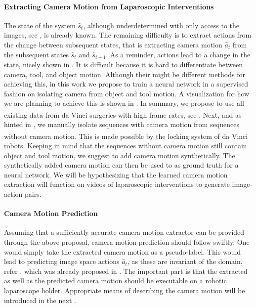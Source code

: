 \paragraph{Extracting Camera Motion from Laparoscopic Interventions}
The state of the system $\hat{s}_t$, although underdetermined with only access to the images, see , is already known. The remaining difficulty is to extract actions from the change between subsequent states, that is extracting camera motion $\hat{a}_t$ from the subsequent states $\hat{s}_t$ and $\hat{s}_{t+1}$. As a reminder, actions lead to a change in the state, nicely shown in . It is difficult because it is hard to differentiate between camera, tool, and object motion. Although their might be different methods for achieving this, in this work we propose to train a neural network in a supervised fashion on isolating camera from object and tool motion. A visualization for how we are planning to achieve this is shown in . In summary, we propose to use all existing data from da Vinci\textsuperscript{\textregistered} surgeries with high frame rates, see . Next, and as hinted in , we manually isolate sequences with camera motion from sequences without camera motion. This is made possible by the locking system of da Vinci\textsuperscript{\textregistered} robots. Keeping in mind that the sequences without camera motion still contain object and tool motion, we suggest to add camera motion synthetically. The synthetically added camera motion can then be used to as ground truth for a neural network. We will be hypothesizing that the learned camera motion extraction will function on videos of laparoscopic interventions to generate image-action pairs.

\paragraph{Camera Motion Prediction} Assuming that a sufficiently accurate camera motion extractor can be provided through the above proposal, camera motion prediction should follow swiftly. One would simply take the extracted camera motion as a pseudo-label. This would lead to predicting image space actions $\hat{a}_t$, as these are invariant of the domain, refer , which was already proposed in . The important part is that the extracted as well as the predicted camera motion should be executable on a robotic laparoscope holder. Appropriate means of describing the camera motion will be introduced in the next .

